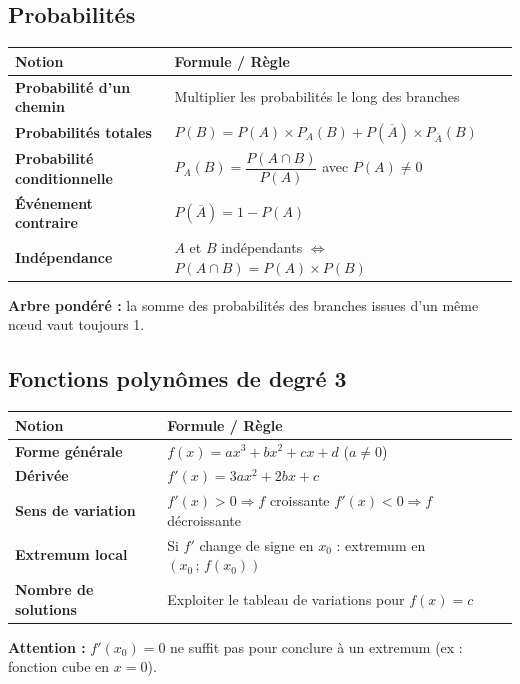 \documentclass[a4paper,11pt]{article}
\begin{document}
\begin{formulairebox}

\subsection*{Probabilités}

\begin{tabular}{>{\bfseries}p{5cm} p{8.5cm}}
\toprule
\textbf{Notion} & \textbf{Formule / Règle} \\
\midrule
Probabilité d'un chemin & Multiplier les probabilités le long des branches \\[4pt]
Probabilités totales & $P(B) = P(A) \times P_A(B) + P(\overline{A}) \times P_{\overline{A}}(B)$ \\[4pt]
Probabilité conditionnelle & $P_A(B) = \dfrac{P(A \cap B)}{P(A)}$ \quad avec $P(A) \neq 0$ \\[6pt]
Événement contraire & $P(\overline{A}) = 1 - P(A)$ \\[4pt]
Indépendance & $A$ et $B$ indépendants $\Leftrightarrow$ $P(A \cap B) = P(A) \times P(B)$ \\[4pt]
\bottomrule
\end{tabular}

\smallskip
\textbf{Arbre pondéré :} la somme des probabilités des branches issues d'un même nœud vaut toujours 1.

\subsection*{Fonctions polynômes de degré 3}

\begin{tabular}{>{\bfseries}p{5cm} p{8.5cm}}
\toprule
\textbf{Notion} & \textbf{Formule / Règle} \\
\midrule
Forme générale & $f(x) = ax^3 + bx^2 + cx + d$ \quad ($a \neq 0$) \\[4pt]
Dérivée & $f'(x) = 3ax^2 + 2bx + c$ \\[4pt]
Sens de variation & $f'(x) > 0 \Rightarrow f$ croissante \quad $f'(x) < 0 \Rightarrow f$ décroissante \\[4pt]
Extremum local & Si $f'$ change de signe en $x_0$ : extremum en $(x_0\,;\,f(x_0))$ \\[4pt]
Nombre de solutions & Exploiter le tableau de variations pour $f(x) = c$ \\[4pt]
\bottomrule
\end{tabular}

\smallskip
\textbf{Attention :} $f'(x_0) = 0$ ne suffit pas pour conclure à un extremum (ex : fonction cube en $x = 0$).

\end{formulairebox}
\end{document}
